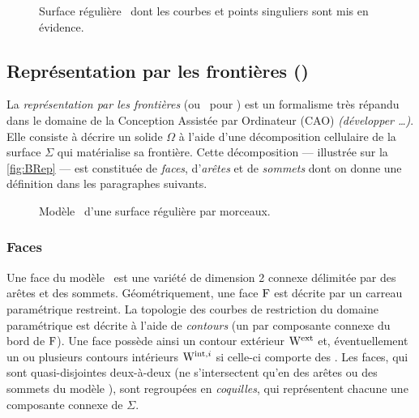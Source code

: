\begin{figure}
	\centering
	
	\caption{Surface régulière \piecewise\ dont les courbes et points singuliers sont mis en évidence.}
	\label{fig:piecewise_smooth_surface_decomposition}
\end{figure}


\subsection{Représentation par les frontières (\brep)}
La \textit{représentation par les frontières} (ou \brep\ pour ) est un formalisme très répandu dans le domaine de la Conception Assistée par Ordinateur (CAO) \textit{(développer \ldots)}.
Elle consiste à décrire un solide $\Omega$ à l'aide d'une décomposition cellulaire de la surface $\Sigma$ qui matérialise sa frontière. 
Cette décomposition --- illustrée sur la \autoref{fig:BRep} --- est constituée de \textit{faces}, d'\textit{arêtes} et de \textit{sommets} dont on donne une définition dans les paragraphes suivants. 

\begin{figure}
	\centering
	
	\caption{Modèle \brep\ d'une surface régulière par morceaux.}
	\label{fig:BRep}
\end{figure}

\subsubsection{Faces}
Une face du modèle \brep\ est une variété de dimension 2 connexe délimitée par des arêtes et des sommets. 
Géométriquement, une face $\mathrm{F}$ est décrite par un carreau paramétrique restreint.
La topologie des courbes de restriction du domaine paramétrique est décrite à l'aide de \textit{contours} (un par composante connexe du bord de $\mathrm{F}$). 
Une face possède ainsi un contour extérieur $\mathrm{W}^{\mathrm{ext}}$ et, éventuellement un ou plusieurs contours intérieurs $\mathrm{W}^{\mathrm{int},i}$ si celle-ci comporte des .
Les faces, qui sont quasi-disjointes deux-à-deux (\ie ne s'intersectent qu'en des arêtes ou des sommets du modèle \brep), sont regroupées en \textit{coquilles}, qui représentent chacune une composante connexe de $\Sigma$. 



